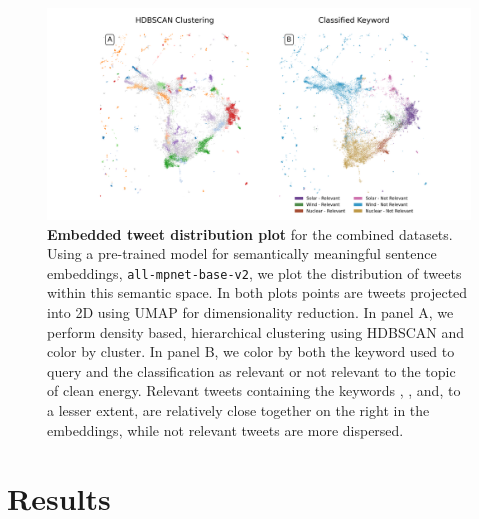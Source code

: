 \begin{figure}
  \centerfloat	
        \includegraphics[width=2.8\columnwidth]{figures/combined_labeled_embedding_horizontal.png} 
  \caption{\textbf{Embedded tweet distribution plot} for the combined datasets.
  Using a pre-trained model for semantically meaningful sentence embeddings, \texttt{all-mpnet-base-v2}, we plot the distribution of tweets within this semantic space.
  In both plots points are tweets projected into 2D using UMAP for dimensionality reduction.
  In panel A, we perform density based, hierarchical clustering using HDBSCAN and color by cluster.
  In panel B, we color by both the keyword used to query and the classification as relevant or not relevant to the topic of clean energy. 
  Relevant tweets containing the keywords , , and, to a lesser extent,  are relatively close together on the right in the embeddings, while not relevant tweets are more dispersed.} 
    \label{fig:combined_embeddings}
\end{figure}


\subsection{}


















\section{Results}
\label{sec:corpusCreation.results}







